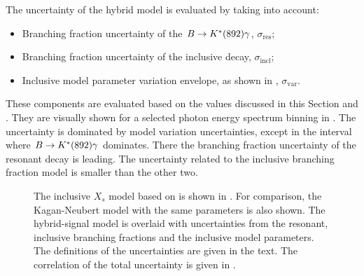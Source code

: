 The uncertainty of the hybrid model is evaluated by taking into account:
\begin{itemize}
    \item Branching fraction uncertainty of the $B\rightarrow K^*(892)\gamma$, $\sigma_{\mathrm{res}}$;
    \item Branching fraction uncertainty of the inclusive \BtoXsgamma decay, $\sigma_{\mathrm{incl}}$;
    \item Inclusive model parameter variation envelope, as shown in , $\sigma_{\mathrm{var}}$.
\end{itemize}
These components are evaluated based on the values discussed in this Section and .
They are visually shown for a selected \BtoXsgamma photon energy spectrum binning in .
The uncertainty is dominated by \BtoXsgamma model variation uncertainties, except in the interval where $B\rightarrow K^*(892)\gamma$ dominates.
There the branching fraction uncertainty of the resonant decay is leading.
The uncertainty related to the \BtoXsgamma inclusive branching fraction model is smaller than the other two.
\begin{figure}[htbp!]
    \centering
    \caption{\label{fig:hybrid_uncertainty_all}
    The inclusive $X_s$ model based on  is shown in .
    For comparison, the Kagan-Neubert model with the same parameters is also shown.
    The hybrid-signal model is overlaid with uncertainties from the resonant, inclusive branching fractions and the inclusive model parameters.
    The definitions of the uncertainties are given in the text.
    The correlation of the total uncertainty is given in .
    }
\end{figure}


